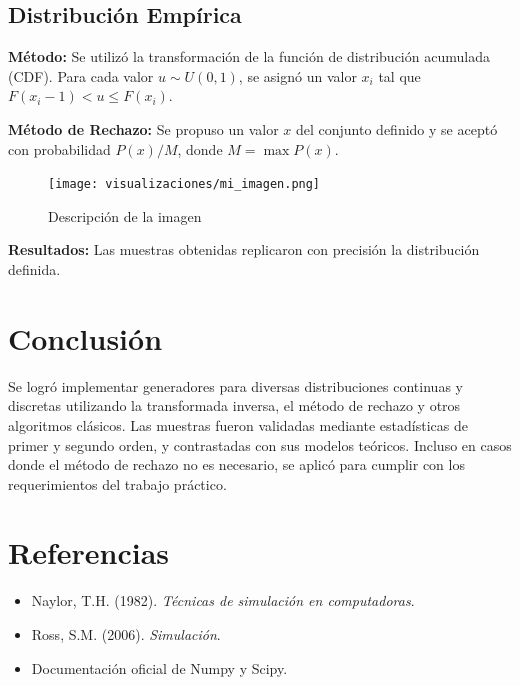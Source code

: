 \documentclass{article}
\begin{document}
\subsection{Distribución Empírica}
\textbf{Método:} Se utilizó la transformación de la función de distribución acumulada (CDF). Para cada valor $u \sim U(0,1)$, se asignó un valor $x_i$ tal que $F(x_i-1) < u \leq F(x_i)$.

\textbf{Método de Rechazo:} Se propuso un valor $x$ del conjunto definido y se aceptó con probabilidad $P(x)/M$, donde $M = \max P(x)$.
\begin{figure}[H] %
    \centering
    \texttt{[image: visualizaciones/mi\_imagen.png]}
    \caption{Descripción de la imagen}
    \label{fig:mi_imagen}
\end{figure}


\textbf{Resultados:} Las muestras obtenidas replicaron con precisión la distribución definida.

\section{Conclusión}
Se logró implementar generadores para diversas distribuciones continuas y discretas utilizando la transformada inversa, el método de rechazo y otros algoritmos clásicos. Las muestras fueron validadas mediante estadísticas de primer y segundo orden, y contrastadas con sus modelos teóricos. Incluso en casos donde el método de rechazo no es necesario, se aplicó para cumplir con los requerimientos del trabajo práctico.

\section*{Referencias}
\begin{itemize}
\item Naylor, T.H. (1982). \textit{Técnicas de simulación en computadoras}.
\item Ross, S.M. (2006). \textit{Simulación}.
\item Documentación oficial de Numpy y Scipy.
\end{itemize}
\end{document}
